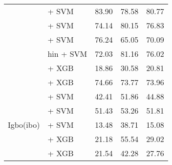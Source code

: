 \begin{longtable}{p{4cm}p{6cm}ccc}
                                          & \citep{wang2024multilingual} + SVM                                     & 83.90                                & 78.58              & 80.77             \\
                                          & \citep{joshi2022l3cubemahasbert} + SVM                                 & 74.14                                & 80.15              & 76.83             \\
                                          & \citep{nogueira2019documentexpansionqueryprediction} + SVM             & 76.24                                & 65.05              & 70.09             \\
                                          & \citep{feng2020languageagnostic} hin + SVM                             & 72.03                                & 81.16              & 76.02             \\
                                          & \citep{all-MiniLM-L12-v2} + XGB                                        & 18.86                                & 30.58              & 20.81             \\
                                          & \citep{sturua2024jinaembeddingsv3multilingualembeddingstask} + XGB     & 74.66                                & 73.77              & 73.96             \\

    \midrule
    \multirow{5}{*}{Igbo(ibo)}            & \citep{feng2022languageagnosticbertsentenceembedding} + SVM            & 42.41                                & 51.86              & 44.88             \\
                                          & \citep{wang2024multilingual} + SVM                                     & 51.43                                & 53.26              & 51.81             \\
                                          & \citep{oketunji2024pmmlv2finetunedigbo} + SVM                          & 13.48                                & 38.71              & 15.08             \\
                                          & \citep{all-MiniLM-L12-v2} + XGB                                        & 21.18                                & 55.54              & 29.02             \\
                                          & \citep{sturua2024jinaembeddingsv3multilingualembeddingstask} + XGB     & 21.54                                & 42.28              & 27.76             \\


\end{longtable}
